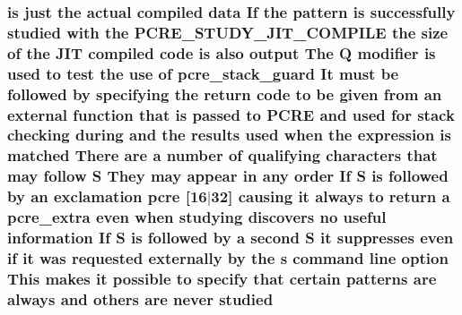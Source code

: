 \subsubsection[{\texorpdfstring{studied}{studied}}]{ {\bf is} just the actual {\bf compiled} {\bf data} If the {\bf pattern} {\bf is} successfully studied {\bf with} the {\bf P\+C\+R\+E\+\_\+\+S\+T\+U\+D\+Y\+\_\+\+J\+I\+T\+\_\+\+C\+O\+M\+P\+I\+LE} the {\bf size} {\bf of} the J\+IT {\bf compiled} {\bf code} {\bf is} also {\bf output} The Q {\bf modifier} {\bf is} {\bf used} {\bf to} test the use {\bf of} {\bf pcre\+\_\+stack\+\_\+guard} It must {\bf be} followed by {\bf specifying} the return {\bf code} {\bf to} {\bf be} {\bf given} {\bf from} an external {\bf function} that {\bf is} passed {\bf to} {\bf P\+C\+RE} and {\bf used} for {\bf stack} checking during and the {\bf results} {\bf used} when the {\bf expression} {\bf is} {\bf matched} There {\bf are} {\bf a} {\bf number} {\bf of} qualifying {\bf characters} that may follow {\bf S} They may appear {\bf in} {\bf any} {\bf order} If {\bf S} {\bf is} followed by an exclamation {\bf pcre} \mbox{[}16$\vert$32\mbox{]} causing {\bf it} always {\bf to} return {\bf a} {\bf pcre\+\_\+extra} even when {\bf studying} discovers no useful information If {\bf S} {\bf is} followed by {\bf a} {\bf second} {\bf S} {\bf it} suppresses even {\bf if} {\bf it} was requested externally by the {\bf s} {\bf command} {\bf line} {\bf option} This makes {\bf it} {\bf possible} {\bf to} specify that certain {\bf patterns} {\bf are} always and others {\bf are} never studied}\hypertarget{pcretest_8txt_a8a1e21c920e9ff004e72fb44da4facc5}{}\label{pcretest_8txt_a8a1e21c920e9ff004e72fb44da4facc5}

